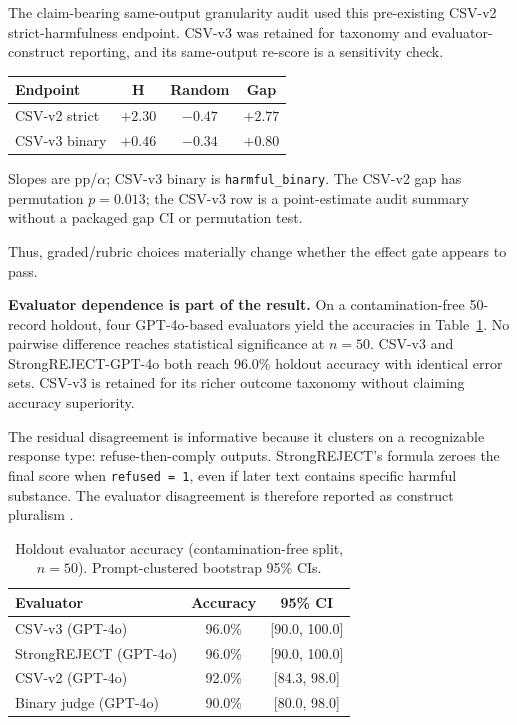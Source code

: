\documentclass{article}
\begin{document}
The claim-bearing same-output granularity audit used this pre-existing CSV-v2 strict-harmfulness endpoint.
CSV-v3 was retained for taxonomy and evaluator-construct reporting, and its same-output re-score is a sensitivity check.

\begin{center}
\vskip 0.04in
\footnotesize
\setlength{\tabcolsep}{3pt}
\begin{tabular}{@{}lccc@{}}
\toprule
\textbf{Endpoint} & \textbf{H} & \textbf{Random} & \textbf{Gap} \\
\midrule
CSV-v2 strict & $+2.30$ & $-0.47$ & $+2.77$ \\
CSV-v3 binary & $+0.46$ & $-0.34$ & $+0.80$ \\
\bottomrule
\end{tabular}

{\footnotesize Slopes are pp/$\alpha$; CSV-v3 binary is \texttt{harmful\_binary}. The CSV-v2 gap has permutation $p = 0.013$; the CSV-v3 row is a point-estimate audit summary without a packaged gap CI or permutation test.}
\vskip 0.03in
\end{center}

Thus, graded/rubric choices materially change whether the effect gate appears to pass.

\textbf{Evaluator dependence is part of the result.}
On a contamination-free 50-record holdout, four GPT-4o-based evaluators yield the accuracies in Table~\ref{tab:evaluator}.
No pairwise difference reaches statistical significance at $n = 50$.
CSV-v3 and StrongREJECT-GPT-4o both reach 96.0\% holdout accuracy with identical error sets.
CSV-v3 is retained for its richer outcome taxonomy without claiming accuracy superiority.

The residual disagreement is informative because it clusters on a recognizable response type: refuse-then-comply outputs.
StrongREJECT's formula zeroes the final score when \texttt{refused = 1}, even if later text contains specific harmful substance.
The evaluator disagreement is therefore reported as construct pluralism \citep{eiras2025judge}.

\begin{table}[t]
\centering
\caption{Holdout evaluator accuracy (contamination-free split, $n = 50$). Prompt-clustered bootstrap 95\% CIs.}
\label{tab:evaluator}
\vskip 0.1in
\small
\begin{tabular}{@{}lcc@{}}
\toprule
\textbf{Evaluator} & \textbf{Accuracy} & \textbf{95\% CI} \\
\midrule
CSV-v3 (GPT-4o)     & 96.0\% & [90.0, 100.0] \\
StrongREJECT (GPT-4o) & 96.0\% & [90.0, 100.0] \\
CSV-v2 (GPT-4o)     & 92.0\% & [84.3, 98.0] \\
Binary judge (GPT-4o) & 90.0\% & [80.0, 98.0] \\
\bottomrule
\end{tabular}
\vskip -0.1in
\end{table}
\end{document}
